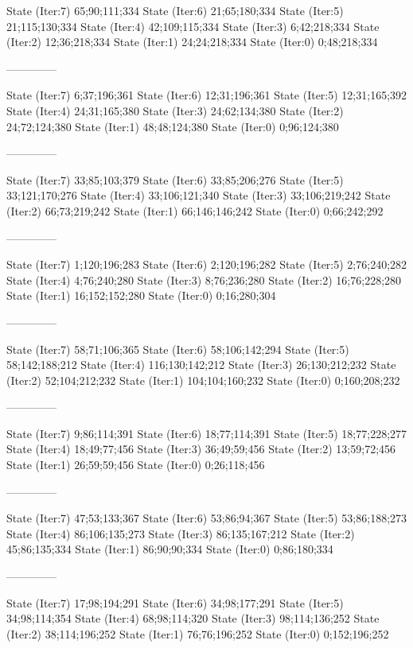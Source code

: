 \documentclass[a4paper,10pt,ngerman]{scrartcl}
\begin{document}
\begin{lstcs}
State (Iter:7) {65;90;111;334}
State (Iter:6) {21;65;180;334}
State (Iter:5) {21;115;130;334}
State (Iter:4) {42;109;115;334}
State (Iter:3) {6;42;218;334}
State (Iter:2) {12;36;218;334}
State (Iter:1) {24;24;218;334}
State (Iter:0) {0;48;218;334}

--------------

State (Iter:7) {6;37;196;361}
State (Iter:6) {12;31;196;361}
State (Iter:5) {12;31;165;392}
State (Iter:4) {24;31;165;380}
State (Iter:3) {24;62;134;380}
State (Iter:2) {24;72;124;380}
State (Iter:1) {48;48;124;380}
State (Iter:0) {0;96;124;380}

--------------

State (Iter:7) {33;85;103;379}
State (Iter:6) {33;85;206;276}
State (Iter:5) {33;121;170;276}
State (Iter:4) {33;106;121;340}
State (Iter:3) {33;106;219;242}
State (Iter:2) {66;73;219;242}
State (Iter:1) {66;146;146;242}
State (Iter:0) {0;66;242;292}

--------------

State (Iter:7) {1;120;196;283}
State (Iter:6) {2;120;196;282}
State (Iter:5) {2;76;240;282}
State (Iter:4) {4;76;240;280}
State (Iter:3) {8;76;236;280}
State (Iter:2) {16;76;228;280}
State (Iter:1) {16;152;152;280}
State (Iter:0) {0;16;280;304}

--------------

State (Iter:7) {58;71;106;365}
State (Iter:6) {58;106;142;294}
State (Iter:5) {58;142;188;212}
State (Iter:4) {116;130;142;212}
State (Iter:3) {26;130;212;232}
State (Iter:2) {52;104;212;232}
State (Iter:1) {104;104;160;232}
State (Iter:0) {0;160;208;232}

--------------

State (Iter:7) {9;86;114;391}
State (Iter:6) {18;77;114;391}
State (Iter:5) {18;77;228;277}
State (Iter:4) {18;49;77;456}
State (Iter:3) {36;49;59;456}
State (Iter:2) {13;59;72;456}
State (Iter:1) {26;59;59;456}
State (Iter:0) {0;26;118;456}

--------------

State (Iter:7) {47;53;133;367}
State (Iter:6) {53;86;94;367}
State (Iter:5) {53;86;188;273}
State (Iter:4) {86;106;135;273}
State (Iter:3) {86;135;167;212}
State (Iter:2) {45;86;135;334}
State (Iter:1) {86;90;90;334}
State (Iter:0) {0;86;180;334}

--------------

State (Iter:7) {17;98;194;291}
State (Iter:6) {34;98;177;291}
State (Iter:5) {34;98;114;354}
State (Iter:4) {68;98;114;320}
State (Iter:3) {98;114;136;252}
State (Iter:2) {38;114;196;252}
State (Iter:1) {76;76;196;252}
State (Iter:0) {0;152;196;252}


\end{lstcs}
\end{document}
